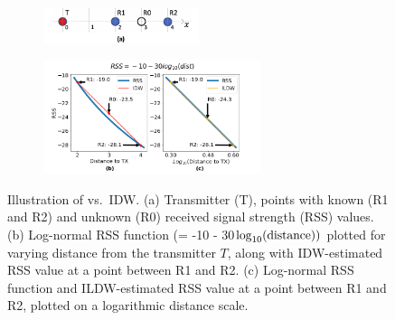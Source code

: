 


\begin{figure}
    \begin{subfigure}[t]{0.9\textwidth}
      \centering
      \includegraphics[width=0.5\textwidth]{chapters/ipsn/figures/interpolate.png}
    \end{subfigure}
    \qquad
    \newline
    \begin{subfigure}[t]{\textwidth}
      \centering
      \includegraphics[width=0.7\textwidth]{chapters/ipsn/figures/ildw.png}
    \end{subfigure}
    \caption{Illustration of \ildw vs.\ IDW.
    (a) Transmitter (T), points with known (R1 and R2) and unknown (R0) received signal strength (RSS) values.
    (b) Log-normal RSS function (= -10 - 30$\log_{10}({\rm distance}))$
    plotted for varying distance from the transmitter $T$, along
    with IDW-estimated RSS value at a point between R1 and R2.
    (c) Log-normal RSS function and ILDW-estimated RSS value at
    a point between R1 and R2, plotted on a logarithmic distance
    scale.}
    \label{fig:ildw}
\end{figure}




